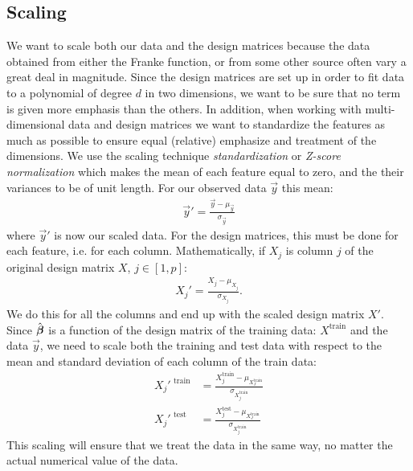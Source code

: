     \subsection{Scaling}\label{sec:scaling}
        We want to scale both our data and the design matrices because the data obtained from either the Franke function, or from some other source often vary a great deal in magnitude. Since the design matrices are set up in order to fit data to a polynomial of degree $d$ in two dimensions, we want to be sure that no term is given more emphasis than the others. In addition, when working with multi-dimensional data and design matrices we want to standardize the features as much as possible to ensure equal (relative) emphasize and treatment of the dimensions. We use the scaling technique \textit{standardization} or \textit{Z-score normalization} which makes the mean of each feature equal to zero, and the their variances to be of unit length. For our observed data $\vec{y}$ this mean:
        \begin{align*}
            \vec{y}' = \frac{\vec{y}-\mu_{\vec{y}}}{\sigma_{\vec{y}}}
        \end{align*}
        where $\vec{y}'$ is now our scaled data. For the design matrices, this must be done for each feature, i.e. for each column.  Mathematically, if $X_j$ is column $j$ of the original design matrix $X$, $j\in[1,p]$:
        \begin{align*}
            X_j' = \frac{X_j-\mu_{X_j}}{\sigma_{X_j}}.
        \end{align*}
        We do this for all the columns and end up with the scaled design matrix $X'$. Since $\hat{\boldsymbol{\beta}}$ is a function of the design matrix of the training data: $X^{\text{train}}$ and the data $\vec{y}$, we need to scale both the training and test data with respect to the mean and standard deviation of each column of the train data:
        \begin{align*}
            X_j'^{\text{ train}} &= \frac{X_j^{\text{train}}-\mu_{X_J^\text{train}}}{\sigma_{X_j^{\text{train}}}} \\
            X_j'^{\text{ test}} &= \frac{X_j^{\text{test}}-\mu_{X_J^\text{train}}}{\sigma_{X_j^{\text{train}}}}
        \end{align*}
        This scaling will ensure that we treat the data in the same way, no matter the actual numerical value of the data. 



